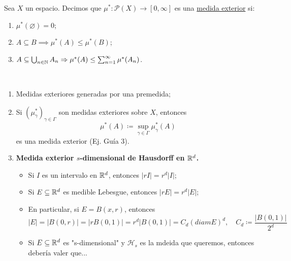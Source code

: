 \begin{definition}
	Sea $X$ un espacio. Decimos que $\mu^{*} : \mathscr{P}(X)\to[0,\infty]$ es una \underline{medida exterior} si:
	\begin{enumerate}
		\item $\mu^{*}(\varnothing) = 0$;

		\item $A \subseteq B \implies \mu^{*}(A)\leq \mu^{*}(B)$;

		\item $A \subseteq \bigcup_{n\in\mathbb{N}} A_n \Rightarrow \mu^{*}(A) \leq \sum_{n=1}^{\infty} \mu^{*}(A_n)$.
	\end{enumerate}
\end{definition}

\begin{eg}~
	\begin{enumerate}
		\item Medidas exteriores generadas por una premedida;

		\item Si $(\mu_{\gamma}^{*})_{\gamma\in\Gamma}$ son medidas exteriores sobre $X$, entonces
		\[ \mu^{*}(A) \coloneq \sup_{\gamma\in\Gamma} \mu_{\gamma}^{*}(A) \]
		es una medida exterior (Ej. Guía 3).

		\item \textbf{Medida exterior $s$-dimensional de Hausdorff en $\mathbb{R}^d$.}
		\begin{itemize}
			\item Si $I$ es un intervalo en $\mathbb{R}^d$, entonces $|rI| = r^d|I|$;

			\item Si $E \subseteq \mathbb{R}^d$ es medible Lebesgue, entonces $|rE| = r^d|E|$;

			\item En particular, si $E = B(x,r)$, entonces
			\[ |E| = |B(0,r)| = |rB(0,1)| = r^d|B(0,1)| = C_d (diam E)^d,\quad C_d \coloneq \frac{|B(0,1)|}{2^d} \]

			\item Si $E \subseteq \mathbb{R}^d$ es "s-dimensional" y $\mathscr{H}_s$ es la mdeida que queremos, entonces debería valer que...
		\end{itemize}
	\end{enumerate}
\end{eg}
